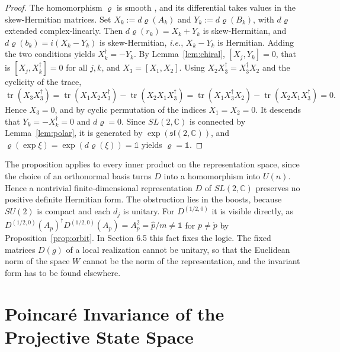 \begin{proof}
	The homomorphism $\varrho$ is smooth \cite[TODO-location]{TODO-Lee13}, and its differential takes values in the skew-Hermitian matrices. Set $X_k:=d\varrho(A_k)$ and $Y_k:=d\varrho(B_k)$, with $d\varrho$ extended complex-linearly. Then $d\varrho(r_k)=X_k+Y_k$ is skew-Hermitian, and $d\varrho(b_k)=i(X_k-Y_k)$ is skew-Hermitian, \textit{i.e.}, $X_k-Y_k$ is Hermitian. Adding the two conditions yields $X_k^\dagger=-Y_k$. By Lemma~\ref{lem:chiral}, $[X_j,Y_k]=0$, that is $[X_j,X_k^\dagger]=0$ for all $j,k$, and $X_3=[X_1,X_2]$. Using $X_2X_3^\dagger=X_3^\dagger X_2$ and the cyclicity of the trace,
	\begin{equation*}
		\operatorname{tr}(X_3X_3^\dagger)=\operatorname{tr}(X_1X_2X_3^\dagger)-\operatorname{tr}(X_2X_1X_3^\dagger)=\operatorname{tr}(X_1X_3^\dagger X_2)-\operatorname{tr}(X_2X_1X_3^\dagger)=0.
	\end{equation*}
	Hence $X_3=0$, and by cyclic permutation of the indices $X_1=X_2=0$. It descends that $Y_k=-X_k^\dagger=0$ and $d\varrho=0$. Since $SL(2,\mathbb{C})$ is connected by Lemma~\ref{lem:polar}, it is generated by $\exp(\mathfrak{sl}(2,\mathbb{C}))$, and $\varrho(\exp\xi)=\exp(d\varrho(\xi))=\mathbb{1}$ yields $\varrho=\mathbb{1}$.
\end{proof}

\begin{remark}\label{rem:non-unitary-boosts}
	The proposition applies to every inner product on the representation space, since the choice of an orthonormal basis turns $D$ into a homomorphism into $U(n)$. Hence a nontrivial finite-dimensional representation $D$ of $SL(2,\mathbb{C})$ preserves no positive definite Hermitian form. The obstruction lies in the boosts, because $SU(2)$ is compact and each $d_j$ is unitary. For $D^{(1/2,0)}$ it is visible directly, as $D^{(1/2,0)}(A_p)^\dagger D^{(1/2,0)}(A_p)=A_p^2=\hat{p}/m\neq\mathbb{1}$ for $p\neq\mathring{p}$ by Proposition~\ref{prop:orbit}. In Section 6.5 this fact fixes the logic. The fixed matrices $D(g)$ of a local realization cannot be unitary, so that the Euclidean norm of the space $W$ cannot be the norm of the representation, and the invariant form has to be found elsewhere.
\end{remark}

\section{Poincar\'e Invariance of the Projective State Space}

